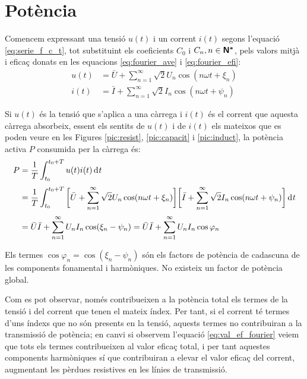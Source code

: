 \section{Potència}

Comencem expressant una tensió $u(t)$ i un corrent $i(t)$
 segons l'equació \eqref{eq:serie_f_c_t}, tot substituint els
 coeficients $C_0$ i $C_n, n \in {\ensuremath{\boldsymbol{\mathsf{N^*}}}}$, pels valors mitjà i eficaç
 donats en les equacions \eqref{eq:fourier_ave} i \eqref{eq:fourier_efi}:
 \begin{align}
    u(t)  &= \bar{U} + \sum_{n=1}^\infty \sqrt{2} U_n \cos (n \omega t +
    \xi_n)\\[0.5ex]
    i(t)  &= \bar{I} + \sum_{n=1}^\infty \sqrt{2} I_n \cos (n \omega t + \psi_n)
 \end{align}

Si  $u(t)$ és la tensió que s'aplica a una càrrega i $i(t)$ és el
corrent que aquesta càrrega absorbeix, essent els sentits de $u(t)$
i de $i(t)$ els mateixos que es poden veure en les Figures
\ref{pic:resist}, \ref{pic:capacit} i \ref{pic:induct}, la potència
activa $P$ consumida per la càrrega és:
\begin{equation}\begin{split}
    P &= \frac{1}{T} \int_{t_0}^{t_0+T} u(t) i(t) \diff t 
    \\[0.5ex]
     &= \frac{1}{T} \int_{t_0}^{t_0+T} \bigg[\bar{U} + \sum_{n=1}^\infty
    \sqrt{2} U_n \cos (n \omega t + \xi_n) \bigg]
    \bigg[\bar{I} + \sum_{n=1}^\infty \sqrt{2} I_n
    \cos (n \omega t + \psi_n)\bigg] \diff t\\[0.5ex]
    &=\bar{U} \bar{I} + \sum_{n=1}^\infty U_n I_n
    \cos(\xi_n-\psi_n) = \bar{U} \bar{I} + \sum_{n=1}^\infty U_n I_n
    \cos \varphi_n \label{eq:pot_fu}
\end{split}\end{equation}

Els termes $\cos \varphi_n=\cos (\xi_n-\psi_n)$ són els factors de
potència de cadascuna de les components fonamental i harmòniques. No
existeix un factor de potència global.

 Com es pot observar, només contribueixen a la potència
total els termes de la tensió i del corrent que tenen el mateix
índex. Per tant, si el corrent té termes d'uns índexs que no són
presents en la tensió, aquests termes no contribuiran a la
transmissió de  potència; en canvi si observem l'equació
\eqref{eq:val_ef_fourier} veiem que tots els termes contribueixen al
valor eficaç total, i per tant aquestes components harmòniques sí que
contribuiran a elevar el valor eficaç del corrent, augmentant
 les pèrdues resistives en les línies de transmissió.

